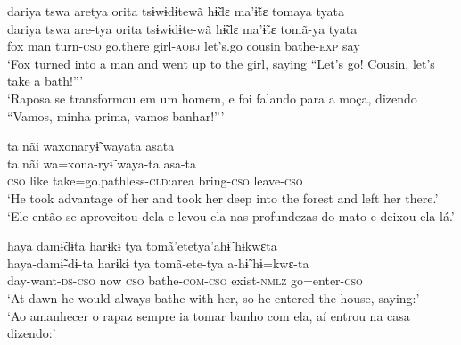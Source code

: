 \documentclass[output=paper,
modfonts,nonflat
]{langsci/langscibook}
\begin{document}
\ea  dariya tswa aretya orita tsɨwɨdɨtewã hɨ̃dɛ ma'ɨ̃tɛ tomaya tyata\\[.3em]
\gll dariya  tswa  are-tya    orita    tsɨwɨdɨte-wã  hɨ̃dɛ    ma'ɨ̃tɛ    tomã-ya{\footnotemark} tyata\\
     fox  man  turn-\textsc{cso}  go.there  girl-\textsc{aobj} let’s.go  cousin    bathe-\textsc{exp}  say\\
\glt ‘Fox turned into a man and went up to the girl, saying “Let’s go! Cousin, let’s take a bath!”’{\footnotemark}\\
‘Raposa se transformou em um homem, e foi falando para a moça, dizendo “Vamos, minha prima, vamos banhar!”'
\addtocounter{footnote}{-1}
\z

\ea ta nãi waxonaryɨ̃ wayata asata\\[.3em]
\gll ta		nãi		wa=xona-ryɨ̃					waya-ta	asa-ta\\
\textsc{cso}	like{\footnotemark}	take=go.pathless-\textsc{cld}:area	bring-\textsc{cso}	leave-\textsc{cso}\\
\glt ‘He took advantage of her and took her deep into the forest and left her there.’\\
‘Ele então se aproveitou dela e levou ela nas profundezas do mato e deixou ela lá.'
\z

\ea haya damɨ̃dɨta harɨkɨ tya tomã'etetya'ahɨ̃ hɨkwɛta\\[.3em]
\gll haya-damɨ̃-dɨ-ta		harɨkɨ		tya		tomã-ete-tya			a-hɨ̃			hɨ=kwɛ-ta\\
day-want-\textsc{ds-cso}		now		\textsc{cso}	bathe-\textsc{com-cso}		exist-\textsc{nmlz}		go=enter-\textsc{cso}\\
\glt ‘At dawn he{\footnotemark} would always bathe with her, so he entered the house, saying:’\\
‘Ao amanhecer o rapaz sempre ia tomar banho com ela, aí entrou na casa dizendo:'
\z
\end{document}
